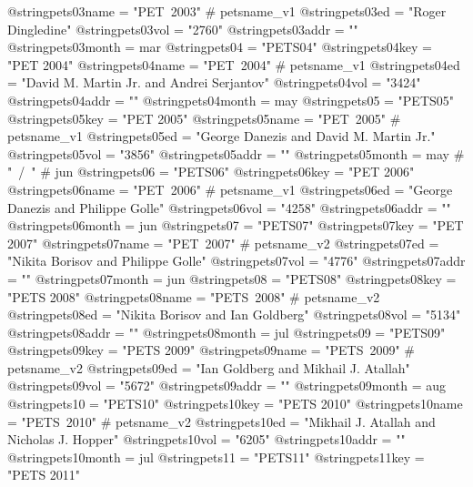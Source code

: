 @string{pets03name =            "PET~2003" # petsname_v1}
@string{pets03ed =              "Roger Dingledine"}
@string{pets03vol =             "2760"}
@string{pets03addr =            ""}
@string{pets03month =           mar}
@string{pets04 =                "PETS04"}
@string{pets04key =             "PET 2004"}
@string{pets04name =            "PET~2004" # petsname_v1}
@string{pets04ed =              "David M. {Martin Jr.} and Andrei Serjantov"}
@string{pets04vol =             "3424"}
@string{pets04addr =            ""}
@string{pets04month =           may}
@string{pets05 =                "PETS05"}
@string{pets05key =             "PET 2005"}
@string{pets05name =            "PET~2005" # petsname_v1}
@string{pets05ed =              "George Danezis and David M. {Martin Jr.}"}
@string{pets05vol =             "3856"}
@string{pets05addr =            ""}
@string{pets05month =           may # "~/~" # jun}
@string{pets06 =                "PETS06"}
@string{pets06key =             "PET 2006"}
@string{pets06name =            "PET~2006" # petsname_v1}
@string{pets06ed =              "George Danezis and Philippe Golle"}
@string{pets06vol =             "4258"}
@string{pets06addr =            ""}
@string{pets06month =           jun}
@string{pets07 =                "PETS07"}
@string{pets07key =             "PET 2007"}
@string{pets07name =            "PET~2007" # petsname_v2}
@string{pets07ed =              "Nikita Borisov and Philippe Golle"}
@string{pets07vol =             "4776"}
@string{pets07addr =            ""}
@string{pets07month =           jun}
@string{pets08 =                "PETS08"}
@string{pets08key =             "PETS 2008"}
@string{pets08name =            "PETS~2008" # petsname_v2}
@string{pets08ed =              "Nikita Borisov and Ian Goldberg"}
@string{pets08vol =             "5134"}
@string{pets08addr =            ""}
@string{pets08month =           jul}
@string{pets09 =                "PETS09"}
@string{pets09key =             "PETS 2009"}
@string{pets09name =            "PETS~2009" # petsname_v2}
@string{pets09ed =              "Ian Goldberg and Mikhail J. Atallah"}
@string{pets09vol =             "5672"}
@string{pets09addr =            ""}
@string{pets09month =           aug}
@string{pets10 =                "PETS10"}
@string{pets10key =             "PETS 2010"}
@string{pets10name =            "PETS~2010" # petsname_v2}
@string{pets10ed =              "Mikhail J. Atallah and Nicholas J. Hopper"}
@string{pets10vol =             "6205"}
@string{pets10addr =            ""}
@string{pets10month =           jul}
@string{pets11 =                "PETS11"}
@string{pets11key =             "PETS 2011"}
